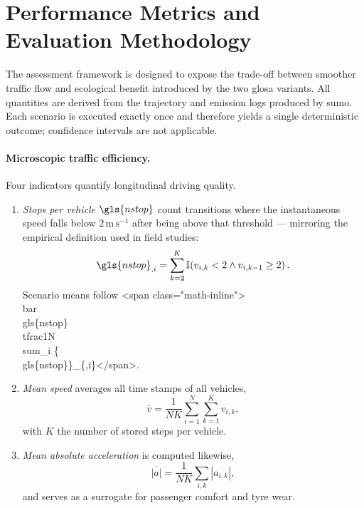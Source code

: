 \section{Performance Metrics and Evaluation Methodology}
\label{sec:performance_evaluation}

The assessment framework is designed to expose the trade-off between smoother traffic flow and ecological benefit introduced by the two \ac{glosa} variants. All quantities are derived from the trajectory and emission logs produced by \ac{sumo}. Each scenario is executed exactly once and therefore yields a single deterministic outcome; confidence intervals are not applicable.

\paragraph{Microscopic traffic efficiency.}
Four indicators quantify longitudinal driving quality.

\begin{enumerate}[label=\textbf{(\roman*)}]
\item \emph{Stops per vehicle} $\gls{nstop}$ count transitions where the instantaneous speed falls below \(2\,\mathrm{m\,s^{-1}}\) after being above that threshold --- mirroring the empirical definition used in field studies:
\begin{equation}
    \gls{nstop}_{,i}= \sum_{k=2}^{K}{\mathbb I}\!\left(v_{i,k}<2 \land v_{i,k-1}\ge 2\right).
\end{equation}
Scenario means follow <span class="math-inline">\\bar \\gls\{nstop\} \= \\tfrac1N\\sum\_i \{\\gls\{nstop\}\}\_\{,i\}</span>.

\item \emph{Mean speed} averages all time stamps of all vehicles,
\begin{equation}
    \bar v = \frac1{N K}\sum_{i=1}^{N}\sum_{k=1}^{K} v_{i,k},
\end{equation}
with \(K\) the number of stored steps per vehicle.

\item \emph{Mean absolute acceleration} is computed likewise,
\begin{equation}
    \overline{|a|} = \frac1{N K}\sum_{i,k}|a_{i,k}|,
\end{equation}
and serves as a surrogate for passenger comfort and tyre wear.
\end{enumerate}


